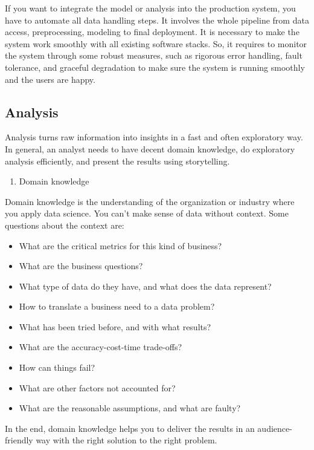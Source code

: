 \documentclass[12pt,]{krantz}
\providecommand{\tightlist}{%
  \setlength{\itemsep}{0pt}\setlength{\parskip}{0pt}}
\begin{document}
If you want to integrate the model or analysis into the production system, you have to automate all data handling steps. It involves the whole pipeline from data access, preprocessing, modeling to final deployment. It is necessary to make the system work smoothly with all existing software stacks. So, it requires to monitor the system through some robust measures, such as rigorous error handling, fault tolerance, and graceful degradation to make sure the system is running smoothly and the users are happy.

\hypertarget{analysis}{%
\subsection{Analysis}\label{analysis}}

Analysis turns raw information into insights in a fast and often exploratory way. In general, an analyst needs to have decent domain knowledge, do exploratory analysis efficiently, and present the results using storytelling.

\begin{enumerate}
\def\labelenumi{(\arabic{enumi})}
\tightlist
\item
  Domain knowledge
\end{enumerate}

Domain knowledge is the understanding of the organization or industry where you apply data science. You can't make sense of data without context. Some questions about the context are:

\begin{itemize}
\tightlist
\item
  What are the critical metrics for this kind of business?
\item
  What are the business questions?
\item
  What type of data do they have, and what does the data represent?
\item
  How to translate a business need to a data problem?
\item
  What has been tried before, and with what results?
\item
  What are the accuracy-cost-time trade-offs?
\item
  How can things fail?
\item
  What are other factors not accounted for?
\item
  What are the reasonable assumptions, and what are faulty?
\end{itemize}

In the end, domain knowledge helps you to deliver the results in an audience-friendly way with the right solution to the right problem.
\end{document}
